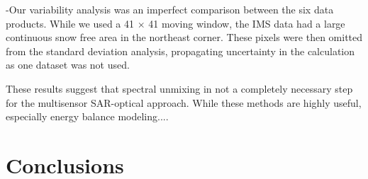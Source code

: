 -Our variability analysis was an imperfect comparison between the six data products. While we used a 41 $\times$ 41 moving window, the IMS data had a large continuous snow free area in the northeast corner. These pixels were then omitted from the standard deviation analysis, propagating uncertainty in the calculation as one dataset was not used.



These results suggest that spectral unmixing in not a completely necessary step for the multisensor SAR-optical approach. While these methods are highly useful, especially energy balance modeling....

\hypertarget{ch6-conclusions}{\section{Conclusions}\label{ch6-conclusions}}



\clearpage


